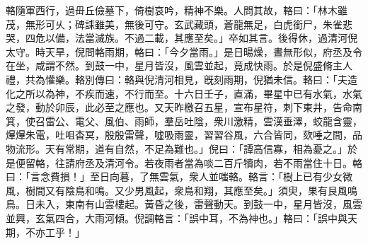 \begin{pinyinscope}
輅隨軍西行，過毌丘儉墓下，倚樹哀吟，精神不樂。人問其故，輅曰：「林木雖茂，無形可乆；碑誄雖美，無後可守。玄武藏頭，蒼龍無足，白虎銜尸，朱雀悲哭，四危以備，法當滅族。不過二載，其應至矣。」卒如其言。後得休，過清河倪太守。時天旱，倪問輅雨期，輅曰：「今夕當雨。」是日暘燥，晝無形似，府丞及令在坐，咸謂不然。到鼓一中，星月皆沒，風雲並起，竟成快雨。於是倪盛脩主人禮，共為懽樂。輅別傳曰：輅與倪清河相見，旣刻雨期，倪猶未信。輅曰：「夫造化之所以為神，不疾而速，不行而至。十六日壬子，直滿，畢星中已有水氣，水氣之發，動於卯辰，此必至之應也。又天昨檄召五星，宣布星符，刺下東井，告命南箕，使召雷公、電父、風伯、雨師，羣岳吐陰，衆川激精，雲漢垂澤，蛟龍含靈，㷸㷸朱電，吐咀杳冥，殷殷雷聲，噓吸雨靈，習習谷風，六合皆同，欬唾之間，品物流形。天有常期，道有自然，不足為難也。」倪曰：「譚高信寡，相為憂之。」於是便留輅，往請府丞及清河令。若夜雨者當為啖二百斤犢肉，若不雨當住十日。輅曰：「言念費損！」至日向暮，了無雲氣，衆人並嗤輅。輅言：「樹上已有少女微風，樹間又有陰鳥和鳴。又少男風起，衆鳥和翔，其應至矣。」須臾，果有艮風鳴鳥。日未入，東南有山雲樓起。黃昏之後，雷聲動天。到鼓一中，星月皆沒，風雲並興，玄氣四合，大雨河傾。倪調輅言：「誤中耳，不為神也。」輅曰：「誤中與天期，不亦工乎！」


\end{pinyinscope}

